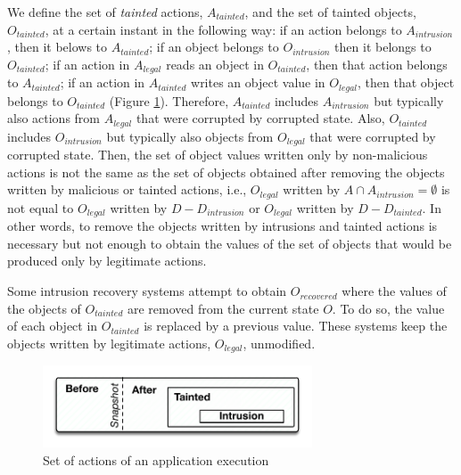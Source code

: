 We define the set of \textit{tainted} actions, $A_{tainted}$, and the set of tainted objects, $O_{tainted}$, at a certain instant in the following way: if an action belongs to $A_{intrusion}$, then it belows to $A_{tainted}$; if an object belongs to $O_{intrusion}$ then it belongs to $O_{tainted}$; if an action in $A_{legal}$ reads an object in $O_{tainted}$, then that action belongs to $A_{tainted}$; if an action in $A_{tainted}$ writes an object value in $O_{legal}$, then that object belongs to $O_{tainted}$ (Figure \ref{img:sets}). Therefore, $A_{tainted}$ includes $A_{intrusion}$ but typically also actions from $A_{legal}$ that were corrupted by corrupted state. Also, $O_{tainted}$ includes $O_{intrusion}$ but typically also objects from $O_{legal}$ that were corrupted by corrupted state. Then, the set of object values written only by non-malicious actions is not the same as the set of objects obtained after removing the objects written by malicious or tainted actions, i.e., $O_{legal}$ written by $A \cap A_{intrusion} = \emptyset$ is not equal to $O_{legal}$ written by $D-D_{intrusion}$ or $O_{legal}$ written by $D-D_{tainted}$. In other words, to remove the objects written by intrusions and tainted actions is necessary but not enough to obtain the values of the set of objects that would be produced only by legitimate actions.

Some intrusion recovery systems \cite{taser,itdb,phoenix} attempt to obtain $O_{recovered}$ where the values of the objects of $O_{tainted}$ are removed from the current state $O$. To do so, the value of each object in $O_{tainted}$ is replaced by a previous value. These systems keep the objects written by legitimate actions, $O_{legal}$, unmodified. \\


\begin{figure}
\centering
\includegraphics[width=80mm]{images/sets}
\caption{Set of actions of an application execution}
\label{img:sets}
\end{figure}


